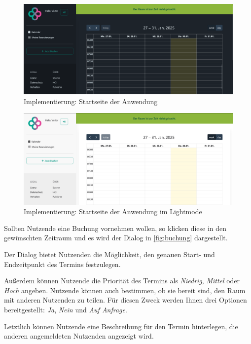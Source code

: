 \begin{figure}[ht]
    \centering
    \includegraphics[width=\textwidth]{figures/impl-views/calendar_dark}
    \caption{Implementierung: Startseite der Anwendung}
    \label{fig:impl-startseite}
\end{figure}
\begin{figure}[ht]
    \centering
    \includegraphics[width=\textwidth]{figures/impl-views/calendar_light}
    \caption{Implementierung: Startseite der Anwendung im Lightmode}
    \label{fig:impl-startseite_lightmode}
\end{figure}
\pagebreak

Sollten Nutzende eine Buchung vornehmen wollen, so klicken diese in den gewünschten Zeitraum
und es wird der Dialog in \ref{fig:buchung} dargestellt.

Der Dialog bietet Nutzenden die Möglichkeit, den genauen Start- und Endzeitpunkt des Termins festzulegen.

Außerdem können Nutzende die Priorität des Termins als \textit{Niedrig}, \textit{Mittel} oder \textit{Hoch} angeben.
Nutzende können auch bestimmen, ob sie bereit sind, den Raum mit anderen Nutzenden zu teilen.
Für diesen Zweck werden Ihnen drei Optionen bereitgestellt: \textit{Ja}, \textit{Nein} und \textit{Auf Anfrage}.

Letztlich können Nutzende eine Beschreibung für den Termin hinterlegen, die anderen angemeldeten Nutzenden angezeigt wird.

